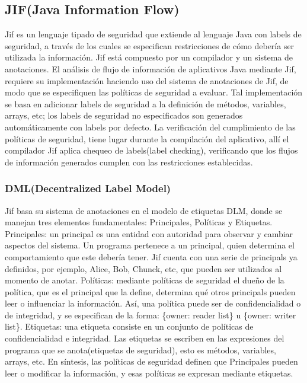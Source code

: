 \subsection{JIF(Java Information Flow)}
Jif es un lenguaje tipado de seguridad que extiende al lenguaje Java con labels
de seguridad, a través de los cuales se especifican restricciones de cómo
debería ser utilizada la información. Jif está compuesto por un compilador y un
sistema de anotaciones.\newline
El análisis de flujo de información de aplicativos Java mediante Jif, requiere
su implementación haciendo uso del sistema de anotaciones de Jif, de modo que se
especifiquen las políticas de seguridad a evaluar.
Tal implementación se basa en adicionar labels de seguridad a la definición
de métodos, variables, arrays, etc; los labels de seguridad no especificados son
generados automáticamente con labels por defecto.\newline
La verificación del cumplimiento de las políticas de seguridad, tiene lugar
durante la compilación del aplicativo, allí el compilador Jif aplica chequeo de
labels(label checking)\cite{jifRef},  verificando que los flujos de información
generados cumplen con las restricciones establecidas.

\subsubsection{DML(Decentralized Label Model)}
Jif basa su sistema de anotaciones en el modelo de etiquetas DLM, donde se
manejan tres elementos fundamentales: Principales, Políticas y
Etiquetas.\newline 
Principales: un principal es una entidad con autoridad para observar y cambiar
aspectos del sistema. Un programa pertenece a un principal, quien determina el
comportamiento que este debería tener. Jif cuenta con una serie de principals ya
definidos, por ejemplo, Alice, Bob, Chunck, etc, que pueden ser
utilizados al momento de anotar.\newline 
Políticas: mediante políticas de seguridad el dueño de la política, que es el
principal que la define, determina qué otros principals pueden leer o
influenciar la información. Así, una política puede ser de confidencialidad o de
integridad, y se especifican de la forma: \{owner: reader list\} u
\{owner: writer list\}.\newline 
Etiquetas: una etiqueta consiste en un conjunto de políticas de confidencialidad
e integridad. Las etiquetas se escriben en las expresiones del programa que se
anota(etiquetas de seguridad), esto es métodos, variables, arrays, etc.\newline 
En síntesis, las políticas de seguridad definen que Principales pueden leer o
modificar la información, y esas políticas se expresan mediante etiquetas.

